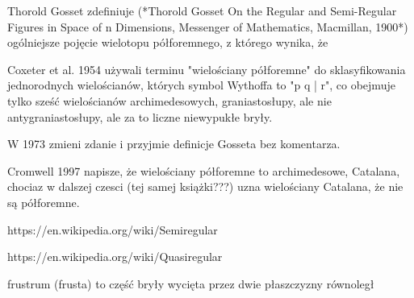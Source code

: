 Thorold Gosset zdefiniuje (*Thorold Gosset On the Regular and Semi-Regular Figures in Space of n Dimensions, Messenger of Mathematics, Macmillan, 1900*) ogólniejsze pojęcie wielotopu półforemnego, z którego wynika, że

Coxeter et al. 1954 używali terminu "wielościany półforemne" do sklasyfikowania jednorodnych wielościanów, których symbol Wythoffa to "p q | r", co obejmuje tylko sześć wielościanów archimedesowych, graniastosłupy, ale nie antygraniastosłupy, ale za to liczne niewypukłe bryły.

W 1973 zmieni zdanie i przyjmie definicje Gosseta bez komentarza.

Cromwell 1997 napisze, że wielościany półforemne to archimedesowe, Catalana, chociaz w dalszej czesci (tej samej książki???) uzna wielościany Catalana, że nie są półforemne.

https://en.wikipedia.org/wiki/Semiregular%

https://en.wikipedia.org/wiki/Quasiregular%

frustrum (frusta) to część bryły wycięta przez dwie płaszczyzny równoległ


